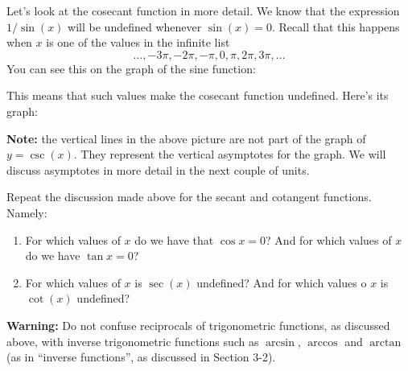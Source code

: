 \documentclass{ximera}
\begin{document}
\begin{example}
  Let's look at the cosecant function in more detail. We know that the expression $1/\sin(x)$ will be undefined whenever $\sin(x) = 0$. Recall that this happens when $x$ is one of the values in the infinite list \[   \ldots, -3\pi, -2\pi, -\pi, 0, \pi, 2\pi, 3\pi, \ldots   \]You can see this on the graph of the sine function:

  \begin{image}
\end{image}

This means that such values make the cosecant function undefined. Here's its graph:

\begin{image}
\end{image}

\begin{callout}
  {\bf Note:} the vertical lines in the above picture are not part of the graph of $y=\csc(x)$. They represent the vertical asymptotes for the graph. We will discuss asymptotes in more detail in the next couple of units.
\end{callout}

\end{example}

\begin{exploration} Repeat the discussion made above for the secant and cotangent functions. Namely:
  \begin{enumerate}[label=\alph*.]
  \item For which values of $x$ do we have that $\cos x = 0$? And for which values of $x$ do we have $\tan x = 0$?  
  \item For which values of $x$ is $\sec(x)$ undefined? And for which values o $x$ is $\cot(x)$ undefined?
  \end{enumerate}
\end{exploration}


\begin{callout}
  {\bf Warning:} Do not confuse reciprocals of trigonometric functions, as discussed above, with inverse trigonometric functions such as $\arcsin$, $\arccos$ and $\arctan$ (as in ``inverse functions'', as discussed in Section 3-2).
\end{callout}
\end{document}
